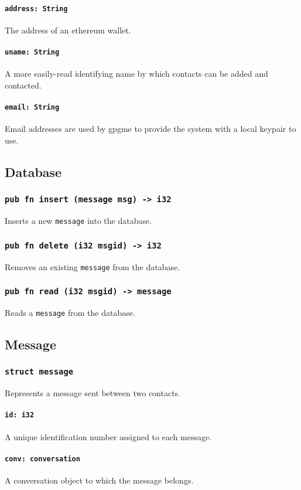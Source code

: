 \documentclass[]{article}
\begin{document}
\paragraph{\texttt{address: String}}
The address of an ethereum wallet.
\paragraph{\texttt{uname: String}}
A more easily-read identifying name by which contacts can be added and contacted.
\paragraph{\texttt{email: String}}
Email addresses are used by gpgme to provide the system with a local keypair to use.

\subsection{Database}
\subsubsection{\texttt{pub fn insert (message msg) -> i32}}
Inserts a new \verb!message! into the database.
\subsubsection{\texttt{pub fn delete (i32 msgid) -> i32}}
Removes an existing \verb!message! from the database.
\subsubsection{\texttt{pub fn read (i32 msgid) -> message}}
Reads a \verb!message! from the database.

\subsection{Message}
\subsubsection{\texttt{struct message}}
Represents a message sent between two contacts.
\paragraph{\texttt{id: i32}}
A unique identification number assigned to each message.
\paragraph{\texttt{conv: conversation}}
A conversation object to which the message belongs.
\end{document}
